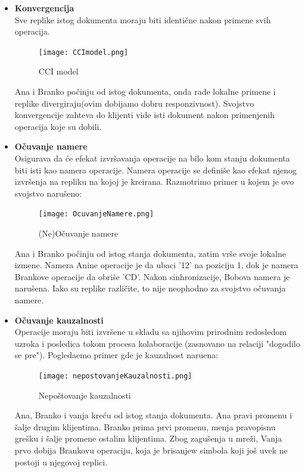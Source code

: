 \documentclass[12pt]{article}
\begin{document}
\begin{itemize}
	\item \textbf{Konvergencija} \\
	      Sve replike istog dokumenta moraju biti identične nakon primene svih operacija.
	      
	      \begin{figure}[H]
	      	\centering
	      	\texttt{[image: CCImodel.png]}
	      	\caption{CCI model}
	      	\label{fig:nls_demo}
	      \end{figure}
	      Ana i Branko počinju od istog dokumenta, onda rade lokalne primene i replike divergiraju(ovim dobijamo dobru responzivnost). Svojstvo konvergencije zahteva do klijenti vide isti dokument nakon primenjenih operacija koje su dobili.
	      
	\item \textbf{Očuvanje namere} \\
	      Osigurava da će efekat izvršavanja operacije na bilo kom stanju dokumenta biti isti kao namera operacije. Namera operacije se definiše kao efekat njenog izvršenja na repliku na kojoj je kreirana. Razmotrimo primer u kojem je ovo svojstvo narušeno:
	      
	      \begin{figure}[H]
	      	\centering
	      	\texttt{[image: OcuvanjeNamere.png]}
	      	\caption{(Ne)Očuvanje namere}
	      	\label{fig:nls_demo}
	      \end{figure}
	      Ana i Branko počinju od istog stanja dokumenta, zatim vrše svoje lokalne izmene. Namera Anine operacije je da ubaci '12' na poziciju 1, dok je namera Brankove operacije da obriše 'CD'. Nakon sinhronizacije, Bobova namera je narušena. Iako su replike različite, to nije neophodno za svojstvo očuvanja namere. 
	      
	\item \textbf{Očuvanje kauzalnosti} \\
	      Operacije moraju biti izvršene u skladu sa njihovim prirodnim redosledom uzroka i posledica tokom procesa kolaboracije (zasnovano na relaciji "dogodilo se pre"). Pogledaemo primer gde je kauzalnost naruena:
	      
	      \begin{figure}[H]
	      	\centering
	      	\texttt{[image: nepostovanjeKauzalnosti.png]}
	      	\caption{Nepoštovanje kauzalnosti}
	      	\label{fig:nls_demo}
	      \end{figure}
	      
	      Ana, Branko i vanja kreću od istog stanja dokumenta. Ana pravi promenu i šalje drugim klijentima. Branko prima prvi promenu, menja pravopisnu grešku i šalje promene ostalim klijentima. Zbog zagušenja u mreži, Vanja prvo dobija Brankovu operaciju, koja je brisanjew simbola koji još uvek ne postoji u njegovoj replici.
	      

\end{itemize}
\end{document}
